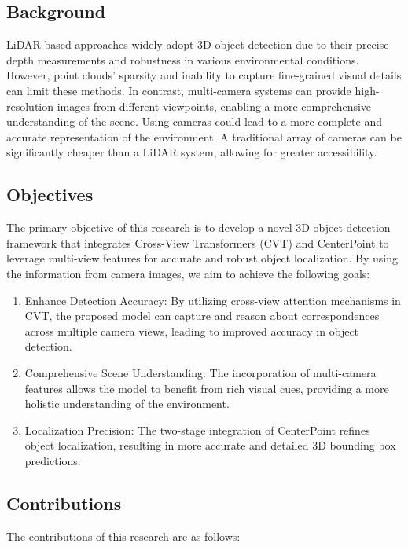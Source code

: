 \documentclass[times, report, parskip, openbib, twocolumn]{article}
\begin{document}
\subsection{Background}

LiDAR-based approaches widely adopt 3D object detection due to their precise depth measurements and robustness in various environmental conditions. However, point clouds' sparsity and inability to capture fine-grained visual details can limit these methods. In contrast, multi-camera systems can provide high-resolution images from different viewpoints, enabling a more comprehensive understanding of the scene. Using cameras could lead to a more complete and accurate representation of the environment. A traditional array of cameras can be significantly cheaper than a LiDAR system, allowing for greater accessibility.

\subsection{Objectives}

The primary objective of this research is to develop a novel 3D object detection framework that integrates Cross-View Transformers (CVT) and CenterPoint to leverage multi-view features for accurate and robust object localization. By using the information from camera images, we aim to achieve the following goals:

\begin{enumerate}
    \item Enhance Detection Accuracy: By utilizing cross-view attention mechanisms in CVT, the proposed model can capture and reason about correspondences across multiple camera views, leading to improved accuracy in object detection.
    \item Comprehensive Scene Understanding: The incorporation of multi-camera features allows the model to benefit from rich visual cues, providing a more holistic understanding of the environment.
    \item Localization Precision: The two-stage integration of CenterPoint refines object localization, resulting in more accurate and detailed 3D bounding box predictions.
\end{enumerate}

\subsection{Contributions}

The contributions of this research are as follows:
\end{document}
